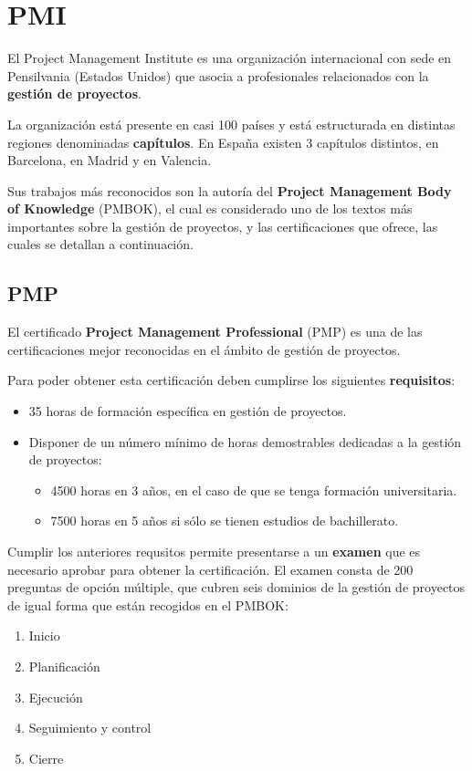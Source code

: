 \section{PMI}

El Project Management Institute es una organización internacional con sede en Pensilvania (Estados Unidos) que asocia a profesionales relacionados con la \textbf{gestión de proyectos}.

La organización está presente en casi 100 países y está estructurada en distintas regiones denominadas \textbf{capítulos}. En España existen 3 capítulos distintos, en Barcelona, en Madrid y en Valencia.

Sus trabajos más reconocidos son la autoría del \textbf{Project Management Body of Knowledge} (PMBOK), el cual es considerado uno de los textos más importantes sobre la gestión de proyectos, y las certificaciones que ofrece, las cuales se detallan a continuación.

\subsection{PMP}

El certificado \textbf{Project Management Professional} (PMP) es una de las certificaciones mejor reconocidas en el ámbito de gestión de proyectos.

Para poder obtener esta certificación deben cumplirse los siguientes \textbf{requisitos}:

\begin{itemize}
\item 35 horas de formación específica en gestión de proyectos.
\item Disponer de un número mínimo de horas demostrables dedicadas a la gestión de proyectos:
	\begin{itemize}
	\item 4500 horas en 3 años, en el caso de que se tenga formación universitaria.
	\item 7500 horas en 5 años si sólo se tienen estudios de bachillerato.
	\end{itemize} 
\end{itemize}

Cumplir los anteriores requsitos permite presentarse a un \textbf{examen} que es necesario aprobar para obtener la certificación. El examen consta de 200 preguntas de opción múltiple, que cubren seis dominios de la gestión de proyectos de igual forma que están recogidos en el PMBOK:

\begin{enumerate}
\item Inicio
\item Planificación
\item Ejecución
\item Seguimiento y control
\item Cierre
\end{enumerate}

